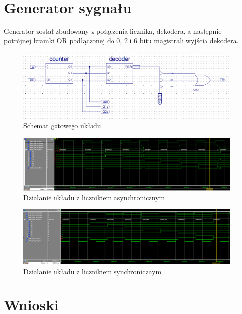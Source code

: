 \documentclass[wide,a4paper,titlepage,12pt] {article}
\begin{document}
  \newpage

  \section{Generator sygnału}
  Generator został zbudowany z połączenia licznika, dekodera, a następnie potrójnej bramki OR podłączonej do 0, 2 i 6 bitu magistrali wyjścia dekodera.

  \begin{figure}[htbp]
    \begin{center}
      \includegraphics[scale=0.4]{uklad.png}
      \caption{Schemat gotowego układu}
    \end{center}
  \end{figure}

\newpage
\begin{landscape}

  \begin{figure}[htbp]
    \begin{center}
      \includegraphics[scale=0.3]{ukl_asynch.png}
      \caption{Działanie układu z licznikiem asynchronicznym}
    \end{center}
  \end{figure}


  \begin{figure}[htbp]
    \begin{center}
      \includegraphics[scale=0.3]{ukl_synch.png}
      \caption{Działanie układu z licznikiem synchronicznym}
    \end{center}
  \end{figure}
\end{landscape}
\newpage

  \section{Wnioski}
\end{document}
